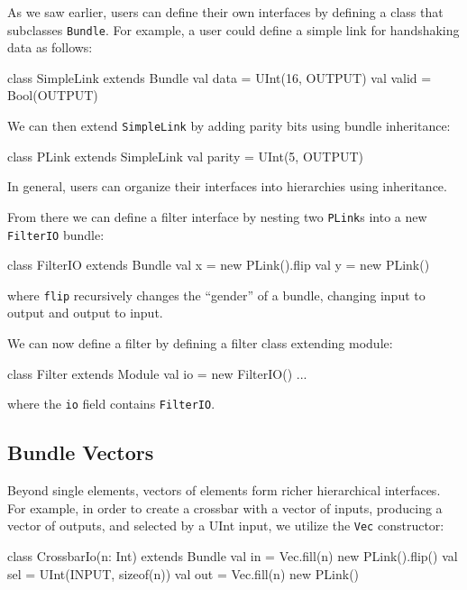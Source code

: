 \documentclass[twocolumn,10pt]{article}
\begin{document}
As we saw earlier, users can define their own interfaces by defining a class that subclasses \verb+Bundle+.  
For example, a user could define a simple link for handshaking data as follows:

\begin{scala}
class SimpleLink extends Bundle { 
  val data  = UInt(16, OUTPUT) 
  val valid = Bool(OUTPUT)
}
\end{scala}

\noindent
We can then extend \verb+SimpleLink+ by adding parity bits using
bundle inheritance:

\begin{scala}
class PLink extends SimpleLink { 
  val parity = UInt(5, OUTPUT) 
}
\end{scala}

\noindent
In general, users can organize their interfaces into hierarchies using inheritance.  

From there we can define a filter interface by nesting two
\verb+PLink+s into a new \verb+FilterIO+ bundle:

\begin{scala}
class FilterIO extends Bundle { 
  val x = new PLink().flip
  val y = new PLink()
}
\end{scala}

\noindent
where \verb+flip+ recursively changes the ``gender'' of a bundle,
changing input to output and output to input.

We can now define a filter by defining a filter class extending module:

\begin{scala}
class Filter extends Module { 
  val io = new FilterIO()
  ...
}
\end{scala}

\noindent 
where the \verb+io+ field contains \verb+FilterIO+. 

\subsection{Bundle Vectors}

Beyond single elements, vectors of elements form richer hierarchical interfaces.  
For example, in order to create a crossbar with a vector of inputs, producing a vector of outputs, and selected by a UInt input, 
we utilize the \verb+Vec+ constructor:

\begin{scala}
class CrossbarIo(n: Int) extends Bundle {
  val in  = Vec.fill(n){ new PLink().flip() }
  val sel = UInt(INPUT, sizeof(n))
  val out = Vec.fill(n){ new PLink() }
}
\end{scala}
\end{document}
